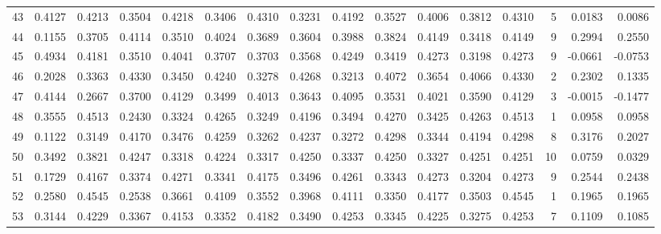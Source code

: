 \begin{tabular}{lrrrrrrrrrrrrrrr}
43  &      0.4127 &  0.4213 &  0.3504 &  0.4218 &  0.3406 &  0.4310 &  0.3231 &  0.4192 &  0.3527 &  0.4006 &   0.3812 &     0.4310 &      5 &                    0.0183 &                     0.0086 \\
44  &      0.1155 &  0.3705 &  0.4114 &  0.3510 &  0.4024 &  0.3689 &  0.3604 &  0.3988 &  0.3824 &  0.4149 &   0.3418 &     0.4149 &      9 &                    0.2994 &                     0.2550 \\
45  &      0.4934 &  0.4181 &  0.3510 &  0.4041 &  0.3707 &  0.3703 &  0.3568 &  0.4249 &  0.3419 &  0.4273 &   0.3198 &     0.4273 &      9 &                   -0.0661 &                    -0.0753 \\
46  &      0.2028 &  0.3363 &  0.4330 &  0.3450 &  0.4240 &  0.3278 &  0.4268 &  0.3213 &  0.4072 &  0.3654 &   0.4066 &     0.4330 &      2 &                    0.2302 &                     0.1335 \\
47  &      0.4144 &  0.2667 &  0.3700 &  0.4129 &  0.3499 &  0.4013 &  0.3643 &  0.4095 &  0.3531 &  0.4021 &   0.3590 &     0.4129 &      3 &                   -0.0015 &                    -0.1477 \\
48  &      0.3555 &  0.4513 &  0.2430 &  0.3324 &  0.4265 &  0.3249 &  0.4196 &  0.3494 &  0.4270 &  0.3425 &   0.4263 &     0.4513 &      1 &                    0.0958 &                     0.0958 \\
49  &      0.1122 &  0.3149 &  0.4170 &  0.3476 &  0.4259 &  0.3262 &  0.4237 &  0.3272 &  0.4298 &  0.3344 &   0.4194 &     0.4298 &      8 &                    0.3176 &                     0.2027 \\
50  &      0.3492 &  0.3821 &  0.4247 &  0.3318 &  0.4224 &  0.3317 &  0.4250 &  0.3337 &  0.4250 &  0.3327 &   0.4251 &     0.4251 &     10 &                    0.0759 &                     0.0329 \\
51  &      0.1729 &  0.4167 &  0.3374 &  0.4271 &  0.3341 &  0.4175 &  0.3496 &  0.4261 &  0.3343 &  0.4273 &   0.3204 &     0.4273 &      9 &                    0.2544 &                     0.2438 \\
52  &      0.2580 &  0.4545 &  0.2538 &  0.3661 &  0.4109 &  0.3552 &  0.3968 &  0.4111 &  0.3350 &  0.4177 &   0.3503 &     0.4545 &      1 &                    0.1965 &                     0.1965 \\
53  &      0.3144 &  0.4229 &  0.3367 &  0.4153 &  0.3352 &  0.4182 &  0.3490 &  0.4253 &  0.3345 &  0.4225 &   0.3275 &     0.4253 &      7 &                    0.1109 &                     0.1085 \\

\end{tabular}
